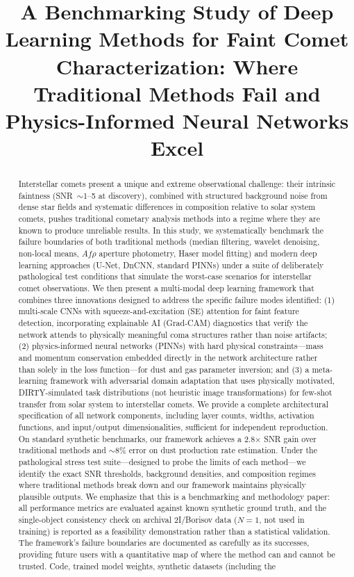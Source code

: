 \documentclass[preprint2]{aastex631}
\begin{document}
\title{A Benchmarking Study of Deep Learning Methods for Faint Comet Characterization: Where Traditional Methods Fail and Physics-Informed Neural Networks Excel}


\accepted{}
\published{}

\begin{abstract}
Interstellar comets present a unique and extreme observational challenge: their intrinsic faintness (SNR~$\sim$1--5 at discovery), combined with structured background noise from dense star fields and systematic differences in composition relative to solar system comets, pushes traditional cometary analysis methods into a regime where they are known to produce unreliable results. In this study, we systematically benchmark the failure boundaries of both traditional methods (median filtering, wavelet denoising, non-local means, $Af\rho$ aperture photometry, Haser model fitting) and modern deep learning approaches (U-Net, DnCNN, standard PINNs) under a suite of deliberately pathological test conditions that simulate the worst-case scenarios for interstellar comet observations. We then present a multi-modal deep learning framework that combines three innovations designed to address the specific failure modes identified: (1) multi-scale CNNs with squeeze-and-excitation (SE) attention for faint feature detection, incorporating explainable AI (Grad-CAM) diagnostics that verify the network attends to physically meaningful coma structures rather than noise artifacts; (2) physics-informed neural networks (PINNs) with hard physical constraints---mass and momentum conservation embedded directly in the network architecture rather than solely in the loss function---for dust and gas parameter inversion; and (3) a meta-learning framework with adversarial domain adaptation that uses physically motivated, DIRTY-simulated task distributions (not heuristic image transformations) for few-shot transfer from solar system to interstellar comets. We provide a complete architectural specification of all network components, including layer counts, widths, activation functions, and input/output dimensionalities, sufficient for independent reproduction. On standard synthetic benchmarks, our framework achieves a 2.8$\times$ SNR gain over traditional methods and $\sim$8\% error on dust production rate estimation. Under the pathological stress test suite---designed to probe the limits of each method---we identify the exact SNR thresholds, background densities, and composition regimes where traditional methods break down and our framework maintains physically plausible outputs. We emphasize that this is a benchmarking and methodology paper: all performance metrics are evaluated against known synthetic ground truth, and the single-object consistency check on archival 2I/Borisov data ($N=1$, not used in training) is reported as a feasibility demonstration rather than a statistical validation. The framework's failure boundaries are documented as carefully as its successes, providing future users with a quantitative map of where the method can and cannot be trusted. Code, trained model weights, synthetic datasets (including the 
\end{abstract}
\end{document}
